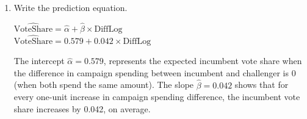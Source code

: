 \documentclass[12pt,letterpaper]{article}
\begin{document}
\begin{enumerate}
		\vspace{.5cm}
		\item Write the prediction equation. \\ 
		\begin{center} 
			$\widehat{\text {VoteShare}} = \hat{\alpha} + \hat{\beta} \times \text{DiffLog}$ \\ [0.2cm]
			$\widehat{\text {VoteShare}} = 0.579 + 0.042 \times \text{DiffLog} $
		\end{center}
		The intercept $\hat{\alpha} = 0.579$, represents the expected incumbent vote share when the difference in campaign spending between incumbent and challenger is 0 (when both spend the same amount). The slope $\hat{\beta} = 0.042$ shows that for every one-unit increase in campaign spending difference, the incumbent vote share increases by 0.042, on average. 
	\end{enumerate} 
\vspace{1.5cm}
\end{document}
